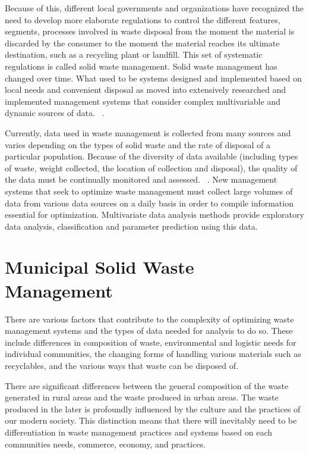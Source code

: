 \documentclass[sigconf]{acmart}
\begin{document}
Because of this, different local governments and organizations have recognized the need to develop more elaborate regulations to control the different features, segments, processes involved in waste disposal from the moment the material is discarded by the consumer to the moment the material reaches its ultimate destination, such as a recycling plant or landfill. This set of systematic regulations is called solid waste management. Solid waste management has changed over time.  What used to be systems designed and implemented based on local needs and convenient disposal as moved into extensively researched and implemented management systems that consider complex multivariable and dynamic sources of data. ~\cite{akbarpour2016}.

Currently, data used in waste management is collected from many sources and varies depending on the types of solid waste and the rate of disposal of a particular population. Because of the diversity of data available (including types of waste, weight collected, the location of collection and disposal), the quality of the data must be continually monitored and assessed. ~\cite{chandrappa2012}. New management systems that seek to optimize waste management must collect large volumes of data from various data sources on a daily basis in order to compile information essential for optimization.  Multivariate data analysis methods provide exploratory data analysis, classification and parameter prediction using this data. ~\cite{bohm2013} 

\section{ Municipal Solid Waste Management}

There are various factors that contribute to the complexity of optimizing waste management systems and the types of data needed for analysis to do so.  These include differences in composition of waste, environmental and logistic needs for individual communities, the changing forms of handling various materials such as recyclables, and the various ways that waste can be disposed of.  

There are significant differences between the general composition of the waste generated in rural areas and the waste produced in urban areas. The waste produced in the later is profoundly influenced by the culture and the practices of our modern society.  This distinction means that there will inevitably need to be differentiation in waste management practices and systems based on each communities needs, commerce, economy, and practices.  ~\cite{chandrappa2012}
\end{document}
